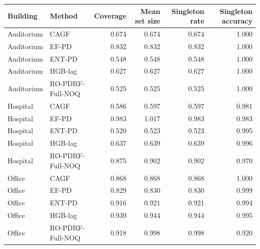 \begin{tabular}{llrrrr}
\toprule
Building & Method & Coverage & Mean set size & Singleton rate & Singleton accuracy \\
\midrule
Auditorium & CAGF & 0.674 & 0.674 & 0.674 & 1.000 \\
Auditorium & EF-PD & 0.832 & 0.832 & 0.832 & 1.000 \\
Auditorium & ENT-PD & 0.548 & 0.548 & 0.548 & 1.000 \\
Auditorium & HGB-lag & 0.627 & 0.627 & 0.627 & 1.000 \\
Auditorium & RO-PDRF-Full-NOQ & 0.525 & 0.525 & 0.525 & 1.000 \\
Hospital & CAGF & 0.586 & 0.597 & 0.597 & 0.981 \\
Hospital & EF-PD & 0.983 & 1.017 & 0.983 & 0.983 \\
Hospital & ENT-PD & 0.520 & 0.523 & 0.523 & 0.995 \\
Hospital & HGB-lag & 0.637 & 0.639 & 0.639 & 0.996 \\
Hospital & RO-PDRF-Full-NOQ & 0.875 & 0.902 & 0.902 & 0.970 \\
Office & CAGF & 0.868 & 0.868 & 0.868 & 1.000 \\
Office & EF-PD & 0.829 & 0.830 & 0.830 & 0.999 \\
Office & ENT-PD & 0.916 & 0.921 & 0.921 & 0.994 \\
Office & HGB-lag & 0.939 & 0.944 & 0.944 & 0.995 \\
Office & RO-PDRF-Full-NOQ & 0.918 & 0.998 & 0.998 & 0.920 \\
\bottomrule
\end{tabular}